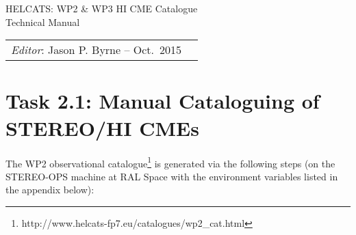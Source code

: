 \documentclass[12pt, a4paper, oneside]{article}
\begin{document}








\begin{center}
{\sc \Large HELCATS: WP2 \& WP3 HI CME Catalogue\\ Technical Manual}
\end{center}

 
\begin{center}
\begin{tabular}{ll}
\textit{Editor}: Jason P. Byrne -- Oct.~2015
\end{tabular}
\end{center}
 

\section*{\sc Task 2.1: Manual Cataloguing of STEREO/HI CMEs}

The WP2 observational catalogue\footnote{http://www.helcats-fp7.eu/catalogues/wp2\_cat.html} is generated via the following steps (on the STEREO-OPS machine at RAL Space with the environment variables listed in the appendix below):
\end{document}
